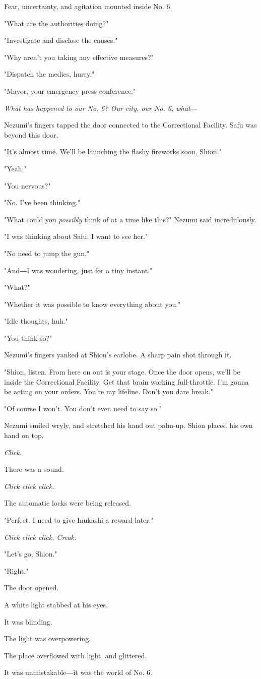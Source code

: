 Fear, uncertainty, and agitation mounted inside No. 6.

"What are the authorities doing?"

"Investigate and disclose the causes."

"Why aren't you taking any effective measures?"

"Dispatch the medics, hurry."

"Mayor, your emergency press conference."

\emph{What has happened to our No. 6? Our city, our No. 6, what―}

\myspace

Nezumi's fingers tapped the door connected to the Correctional Facility.
Safu was beyond this door.

"It's almost time. We'll be launching the flashy fireworks soon, Shion."

"Yeah."

"You nervous?"

"No. I've been thinking."

"What could you \emph{possibly} think of at a time like this?" Nezumi said
incredulously.

"I was thinking about Safu. I want to see her."

"No need to jump the gun."

"And―I was wondering, just for a tiny instant."

"What?"

"Whether it was possible to know everything about you."

"Idle thoughts, huh."

"You think so?"

Nezumi's fingers yanked at Shion's earlobe. A sharp pain shot through
it.

"Shion, listen. From here on out is your stage. Once the door opens,
we'll be inside the Correctional Facility. Get that brain working
full-throttle. I'm gonna be acting on your orders. You're my lifeline.
Don't you dare break."

"Of course I won't. You don't even need to say so."

Nezumi smiled wryly, and stretched his hand out palm-up. Shion placed
his own hand on top.

\emph{Click.}

There was a sound.

\emph{Click click click.}

The automatic locks were being released.

"Perfect. I need to give Inukashi a reward later."

\emph{Click click click. Creak.}

"Let's go, Shion."

"Right."

The door opened.

A white light stabbed at his eyes.

It was blinding.

The light was overpowering.

The place overflowed with light, and glittered.

It was unmistakable―it was the world of No. 6.